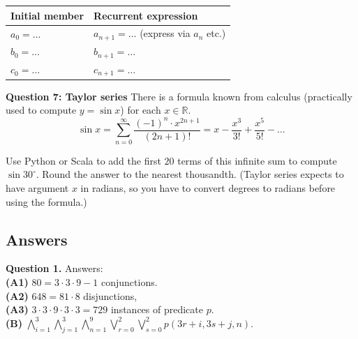 \documentclass[jou]{apa6}
\begin{document}
\begin{tabular}{|l|l|} \hline
{\bf Initial member} & {\bf Recurrent expression} \\ \hline
$a_0 = \ldots$ & $a_{n+1} = \ldots$ (express via $a_n$ etc.) \\ \hline
$b_0 = \ldots$ & $b_{n+1} = \ldots$ \\ \hline 
$c_0 = \ldots$ & $c_{n+1} = \ldots$ \\ \hline 
\end{tabular}

\vspace{6pt}
{\bf Question 7: Taylor series} There is a formula known from calculus (practically 
used to compute $y = \sin x$) for each $x \in \mathbb{R}$. 
$$\sin x = \sum\limits_{n=0}^{\infty} \frac{(-1)^n \cdot x^{2n+1}}{(2n+1)!} = x - \frac{x^3}{3!}
+ \frac{x^5}{5!} - \ldots$$

Use Python or Scala to add the first $20$ terms of this infinite sum
to compute $\sin 30^{\circ}$. Round the answer
to the nearest thousandth.
(Taylor series expects to have argument $x$ in radians, so you have to convert degrees to radians 
before using the formula.)





\newpage

\subsection{Answers}

\vspace{6pt}
{\bf Question 1.} Answers:\\ 
{\bf (A1)} $80 = 3 \cdot 3 \cdot 9 - 1$ conjunctions.\\
{\bf (A2)} $648 = 81 \cdot 8$ disjunctions,\\
{\bf (A3)} $3 \cdot 3 \cdot 9 \cdot 3 \cdot 3 = 729$ instances of predicate $p$.\\
{\bf (B)} $\bigwedge\limits_{i = 1}^{3} \bigwedge\limits_{j = 1}^{3} \bigwedge\limits_{n = 1}^{9}
\bigvee\limits_{r = 0}^{2} \bigvee\limits_{s = 0}^{2} p(3r+i, 3s+j, n).$
\end{document}
